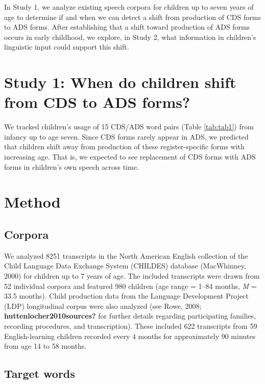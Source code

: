 \documentclass[10pt, letterpaper]{article}
\begin{document}
In Study 1, we analyze existing speech corpora for children up to seven
years of age to determine if and when we can detect a shift from
production of CDS forms to ADS forms. After establishing that a shift
toward production of ADS forms occurs in early childhood, we explore, in
Study 2, what information in children's linguistic input could support
this shift.

\hypertarget{study-1-when-do-children-shift-from-cds-to-ads-forms}{%
\section{Study 1: When do children shift from CDS to ADS
forms?}\label{study-1-when-do-children-shift-from-cds-to-ads-forms}}

We tracked children's usage of 15 CDS/ADS word pairs (Table
\ref{tab:tab1}) from infancy up to age seven. Since CDS forms rarely
appear in ADS, we predicted that children shift away from production of
these register-specific forms with increasing age. That is, we expected
to see replacement of CDS forms with ADS forms in children's own speech
across time.

\hypertarget{method}{%
\section{Method}\label{method}}

\hypertarget{corpora}{%
\subsection{Corpora}\label{corpora}}

We analyzed 8251 transcripts in the North American English collection of
the Child Language Data Exchange System (CHILDES) database (MacWhinney,
2000) for children up to 7 years of age. The included transcripts were
drawn from 52 individual corpora and featured 980 children (age range =
1--84 months, \emph{M} = 33.5 months). Child production data from the
Language Development Project (LDP) longitudinal corpus were also
analyzed (see Rowe, 2008; \textbf{huttenlocher2010sources?} for further
details regarding participating families, recording procedures, and
transcription). These included 622 transcripts from 59 English-learning
children recorded every 4 months for approximately 90 minutes from age
14 to 58 months.

\hypertarget{target-words}{%
\subsection{Target words}\label{target-words}}
\end{document}
